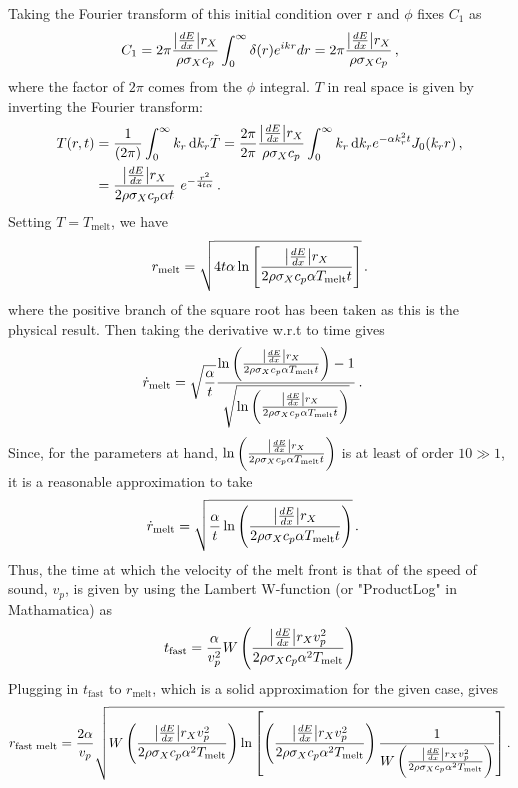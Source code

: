 \documentclass{article}
\newcommand*\diff{\mathop{}\!\mathrm{d}}
\newcommand*\te[1]{\text{#1}}
\newcommand*\p[1]{\left(#1\right)}
\newcommand*\ps[1]{\left[#1\right]}
\newcommand*\f[2]{\frac{#1}{#2}}
\begin{document}
Taking the Fourier transform of this initial condition over r and $\phi$ fixes $C_1$ as 
\begin{align}
C_1 =  2\pi \f{\abs{\frac{dE}{dx}}r_X}{\rho \sigma_X c_p}\int_{0}^{\infty}\delta(r)e^{i k r} dr = 2\pi\f{\abs{\frac{dE}{dx}}r_X}{\rho \sigma_X c_p}\,,
\end{align}
where the factor of $2 \pi$ comes from the $\phi$ integral.
$T$ in real space is given by inverting the Fourier transform:
\begin{align}
T(r,t) &=\frac{1}{\p{2\pi}} \int_0^\infty k_r \diff{k_r}\tilde{T} = \frac{2\pi}{2\pi}\f{\abs{\frac{dE}{dx}}r_X}{\rho \sigma_X c_p}\int_0^\infty k_r\diff k_r e^{-\alpha k_r^2 t}J_0(k_r r)\,,\\
&=\f{\abs{\frac{dE}{dx}}r_X}{2 \rho \sigma_X c_p \alpha t}\ e^{-\f{r^2}{4t\alpha}}\,.
\end{align}
Setting $T = T_\te{melt}$, we have
\begin{align}
r_\te{melt} = \sqrt{4t\alpha\ln\ps{\f{\abs{\frac{dE}{dx}}r_X}{2 \rho \sigma_X c_p \alpha T_\te{melt} t}}}\,.
\end{align}
where the positive branch of the square root has been taken as this is the physical result. Then taking the derivative w.r.t to time gives
\begin{align}
\dot r_\te{melt} &=\sqrt{\f{\alpha}{t}}\f{\ln\p{\f{\abs{\frac{dE}{dx}}r_X}{2 \rho \sigma_X c_p \alpha T_\te{melt} t}} - 1}{\sqrt{\ln\p{\f{\abs{\frac{dE}{dx}} r_X}{2 \rho \sigma_X c_p \alpha T_\te{melt} t}}}}\,.
\end{align}
Since, for the parameters at hand, $\ln\p{\f{\abs{\frac{dE}{dx}}r_X}{2 \rho \sigma_X c_p \alpha T_\te{melt} t}}$ is at least of order $10 \gg 1$, it is a reasonable approximation to take
\begin{align}
\dot r_\te{melt} &=\sqrt{\f{\alpha}{t}\ln\p{\frac{\abs{\frac{dE}{dx}}r_X}{2 \rho \sigma_X c_p \alpha T_\te{melt} t}}}\,.
\end{align}
Thus, the time at which the velocity of the melt front is that of the speed of sound, $v_p$, is given by using the Lambert W-function (or "ProductLog" in Mathamatica) as
\begin{align}
t_{\te{fast}} = \f{\alpha}{v_p^2}W\p{{\f{\abs{\frac{dE}{dx}}r_Xv_p^2}{2 \rho \sigma_X c_p \alpha^2 T_\te{melt}}}}
\end{align}
Plugging in $t_{\te{fast}}$ to $r_\te{melt}$, which is a solid approximation for the given case, gives
\begin{align}
r_\te{fast melt} =  \frac{2\alpha}{v_p}\sqrt{W\p{{\f{\abs{\frac{dE}{dx}}r_{X}v_p^2}{2 \rho \sigma_X c_p \alpha^2 T_\te{melt}}}}\ln\ps{\p{\frac{\abs{\frac{dE}{dx}}r_{X}v_p^2}{2 \rho \sigma_X c_p \alpha^2 T_\te{melt}}}\frac{1}{W\p{{\f{\abs{\frac{dE}{dx}}r_{X}v_p^2}{2 \rho \sigma_X c_p \alpha^2 T_\te{melt}}}}
}}}\,.
\end{align}
\end{document}
